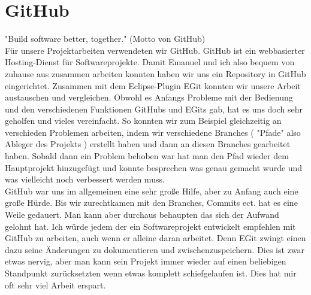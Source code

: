 \section{GitHub}

"Build software better, together." (Motto von GitHub)\\

Für unsere Projektarbeiten verwendeten wir GitHub. GitHub ist ein webbasierter Hosting-Dienst für Softwareprojekte. Damit Emanuel und ich also bequem von zuhause aus zusammen arbeiten konnten haben wir uns ein Repository in GitHub eingerichtet. Zusammen mit dem Eclipse-Plugin EGit konnten wir unsere Arbeit austauschen und vergleichen. Obwohl es Anfangs Probleme mit der Bedienung und den verschiedenen Funktionen GitHubs und EGits gab, hat es uns doch sehr geholfen und vieles vereinfacht. So konnten wir zum Beispiel gleichzeitig an verschieden Problemen arbeiten, indem wir verschiedene Branches ( "Pfade" also Ableger des Projekts ) erstellt haben und dann an diesen Branches gearbeitet haben. Sobald dann ein Problem behoben war hat man den Pfad wieder dem Hauptprojekt hinzugefügt und konnte besprechen was genau gemacht wurde und was vielleicht noch verbessert werden muss.\\

GitHub war uns im allgemeinen eine sehr große Hilfe, aber zu Anfang auch eine große Hürde. Bis wir zurechtkamen mit den Branches, Commits ect. hat es eine Weile gedauert. Man kann aber durchaus behaupten das sich der Aufwand gelohnt hat. Ich würde jedem der ein Softwareprojekt entwickelt empfehlen mit GitHub zu arbeiten, auch wenn er alleine daran arbeitet. Denn EGit zwingt einen dazu seine Änderungen zu dokumentieren und zwischenzuspeichern. Dies ist zwar etwas nervig, aber man kann sein Projekt immer wieder auf einen beliebigen Standpunkt zurücksetzten wenn etwas komplett schiefgelaufen ist. Dies hat mir oft sehr viel Arbeit erspart. 